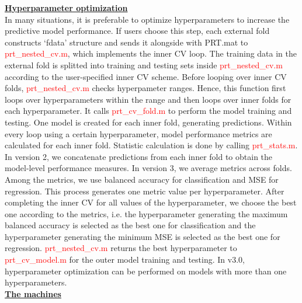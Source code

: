 \noindent \textbf{\underline{Hyperparameter optimization}}
\\

In many situations, it is preferable to optimize hyperparameters to increase the predictive model performance. If users choose this step, each external fold constructs ‘fdata’ structure and sends it alongside with PRT.mat to \textcolor{red}{prt\_nested\_cv.m}, which implements the inner CV loop. The training data in the external fold is splitted into training and testing sets inside \textcolor{red}{prt\_nested\_cv.m} according to the user-specified inner CV scheme. Before looping over inner CV folds, \textcolor{red}{prt\_nested\_cv.m} checks hyperpameter ranges. Hence, this function first loops over hyperparameters within the range and then loops over inner folds for each hyperparameter. It calls \textcolor{red}{prt\_cv\_fold.m} to perform the model training and testing. One model is created for each inner fold, generating predictions. Within every loop using a certain hyperparameter, model performance metrics are calculated for each inner fold. Statistic calculation is done by calling \textcolor{red}{prt\_stats.m}. In version 2, we concatenate predictions from each inner fold to obtain the model-level performance measures. In version 3, we average metrics across folds. Among the metrics, we use balanced accuracy for classification and MSE for regression. This process generates one metric value per hyperparameter. After completing the inner CV for all values of the hyperparameter, we choose the best one according to the metrics, i.e. the hyperparameter generating the maximum balanced accuracy is selected as the best one for classification and the hyperparameter generating the minimum MSE is selected as the best one for regression. \textcolor{red}{prt\_nested\_cv.m} returns the best hyperparameter to \textcolor{red}{prt\_cv\_model.m} for the outer model training and testing. In v3.0,  hyperparameter optimization can be performed on models with more than one hyperparameters.   
\\

\noindent \textbf{\underline{The machines}}
\\

